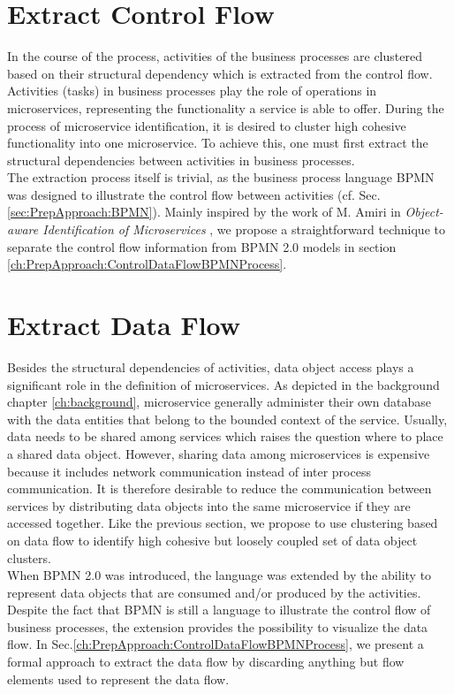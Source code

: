 \section{Extract Control Flow}
\label{sec:Solution:ExtractControlFlow}
In the course of the process, activities of the business processes are clustered based on their structural dependency which is extracted from the control flow. Activities (tasks) in business processes play the role of operations in microservices, representing the functionality a service is able to offer. During the process of microservice identification, it is desired to cluster high cohesive functionality into one microservice. To achieve this, one must first extract the structural  dependencies between activities in business processes. \\
The extraction process itself is trivial, as the business process language BPMN was designed to illustrate the control flow between activities (cf. Sec.\ref{sec:PrepApproach:BPMN}). Mainly inspired by the work of M. Amiri in \textit{Object-aware Identification of Microservices} \cite{ObjectAwareAmiri}, we propose a straightforward technique to separate the control flow information from BPMN 2.0 models in section \ref{ch:PrepApproach:ControlDataFlowBPMNProcess}.




\section{Extract Data Flow}
\label{sec:Solution:ExtractDataFlow}
Besides the structural dependencies of activities, data object access plays a significant role in the definition of microservices. As depicted in the background chapter \ref{ch:background}, microservice generally administer their own database with the data entities that belong to the bounded context of the service. Usually, data needs to be shared among services which raises the question where to place a shared data object. However, sharing data among microservices is expensive because it includes network communication instead of inter process communication. It is therefore desirable to reduce the communication between services by distributing data objects into the same microservice if they are accessed together.  
Like the previous section, we propose to use clustering based on data flow to identify high cohesive but loosely coupled set of data object clusters. \\
When BPMN 2.0 was introduced, the language was extended by the ability to represent data objects that are consumed and/or produced by the activities. Despite the fact that BPMN is still a language to illustrate the control flow of business processes, the extension provides the possibility to visualize the data flow. In Sec.\ref{ch:PrepApproach:ControlDataFlowBPMNProcess}, we present a formal approach to extract the data flow by discarding anything but flow elements used to represent the data flow.



